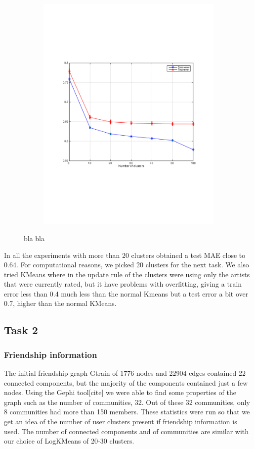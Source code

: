 \begin{figure}[h]
\begin{subfigure}[b]{0.45\textwidth}
    \includegraphics[width=\textwidth]{figures/kmeans_train_test.pdf}
    \caption{}
  \end{subfigure}
  \caption{bla bla}
  \label{fig:kmeans_final}
\end{figure}

In all the experiments with more than 20 clusters obtained a test MAE close to 0.64. 
For computational reasons, we picked 20 clusters for the next task.
We also tried KMeans where in the update rule of the clusters were using only the artists that were currently rated, but it have problems with overfitting, giving a train error less than 0.4 much less than the normal Kmeans but a test error a bit over 0.7, higher than the normal KMeans.

\subsection{Task 2}
\subsubsection{Friendship information}
The initial friendship graph Gtrain of 1776 nodes and 22904 edges contained 22 connected components, but the majority of the components contained just a few nodes.
Using the Gephi tool[cite] we were able to find some properties of the graph such as the number of communities, 32.  Out of these 32 communities, only 8 communities had more than 150 members.
These statistics were run so that we get an idea of the number of user clusters present if friendship information is used. The number of connected components and of communities are similar with our choice of LogKMeans of 20-30 clusters.

